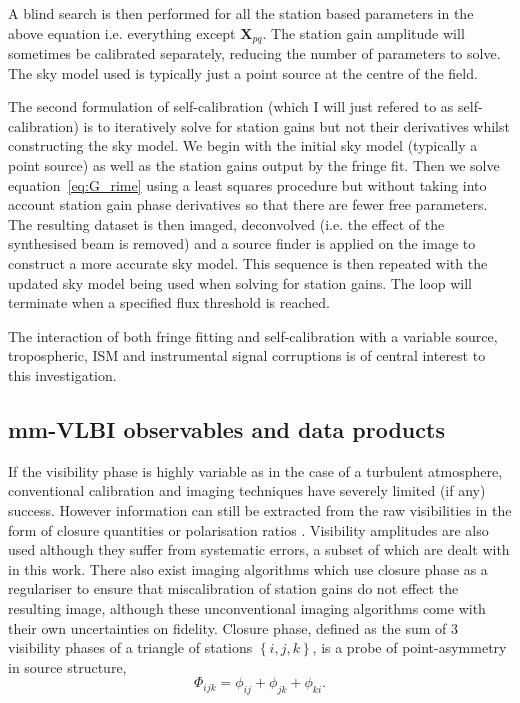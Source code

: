 A blind search is then performed for all the station based parameters in the above equation i.e. everything except $\bm X_{pq}$. The station gain amplitude will sometimes be calibrated separately, reducing the number of parameters to solve. The sky model used is typically just a point source at the centre of the field. 


The second formulation of self-calibration (which I will just refered to as self-calibration) is to iteratively solve for station gains but not their derivatives whilst constructing the sky model. We begin with the initial sky model (typically a point source) as well as the station gains output by the fringe fit. Then we solve equation~\ref{eq:G_rime} using a least squares procedure but without taking into account station gain phase derivatives so that there are fewer free parameters. The resulting dataset is then imaged, deconvolved (i.e. the effect of the synthesised beam is removed) and a source finder is applied on the image to construct a more accurate sky model. This sequence is then repeated with the updated sky model being used when solving for station gains. The loop will terminate when a specified flux threshold is reached.


The interaction of both fringe fitting and self-calibration with a variable source, tropospheric, ISM and instrumental signal corruptions is of central interest to this investigation.


\subsection{mm-VLBI observables and data products}

If the visibility phase is highly variable as in the case of a turbulent atmosphere,  conventional calibration and imaging techniques have severely limited (if any) success. However information can still be extracted from the raw visibilities in the form of closure quantities \citep{Monnier_2007} or polarisation ratios \citep{Fish_2009}. Visibility amplitudes are also used although they suffer from systematic errors, a subset of which are dealt with in this work. There also exist imaging algorithms \citep[e.g.][]{Lu_2014,Bouman_2015,Chael_2016} which use closure phase as a regulariser to ensure that miscalibration of station gains do not effect the resulting image, although these unconventional imaging algorithms come with their own uncertainties on fidelity. Closure phase, defined as the sum of 3 visibility phases of a triangle of stations $\left\{i,j,k\right\}$, is a probe of point-asymmetry in source structure,
\begin{equation}
\Phi_{ijk} = \phi_{ij}+\phi_{jk}+\phi_{ki}.
\end{equation}

